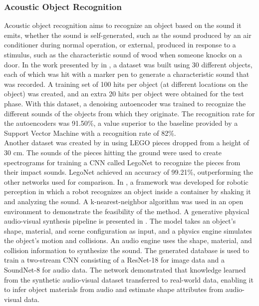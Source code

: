\subsubsection{Acoustic Object Recognition}

Acoustic object recognition aims to recognize an object based on the sound it emits, whether the sound is self-generated, such as the sound produced by an air conditioner during normal operation, or external, produced in response to a stimulus, such as the characteristic sound of wood when someone knocks on a door. In the work presented by \citeauthor{AOR1} in \cite{AOR1}, a dataset was built using 30 different objects, each of which was hit with a marker pen to generate a characteristic sound that was recorded. A training set of 100 hits per object (at different locations on the object) was created, and an extra 20 hits per object were obtained for the test phase. With this dataset, a denoising autoencoder was trained to recognize the different sounds of the objects from which they originate. The recognition rate for the autoencoders was 91.50\%, a value superior to the baseline provided by a Support Vector Machine with a recognition rate of 82\%. \\
Another dataset was created by \citeauthor{AOR2_LEGO} in \cite{AOR2_LEGO} using LEGO pieces dropped from a height of 30 cm. The sounds of the pieces hitting the ground were used to create spectrograms for training a CNN called LegoNet to recognize the pieces from their impact sounds. LegoNet achieved an accuracy of 99.21\%, outperforming the other networks used for comparison. In \cite{AOR3_ROBOT}, a framework was developed for robotic perception in which a robot recognizes an object inside a container by shaking it and analyzing the sound. A k-nearest-neighbor algorithm was used in an open environment to demonstrate the feasibility of the method. A generative physical audio-visual synthesis pipeline is presented in \cite{AOR4}. The model takes an object's shape, material, and scene configuration as input, and a physics engine simulates the object's motion and collisions. An audio engine uses the shape, material, and collision information to synthesize the sound. The generated database is used to train a two-stream CNN consisting of a ResNet-18 for image data and a SoundNet-8 for audio data. The network demonstrated that knowledge learned from the synthetic audio-visual dataset transferred to real-world data, enabling it to infer object materials from audio and estimate shape attributes from audio-visual data.

